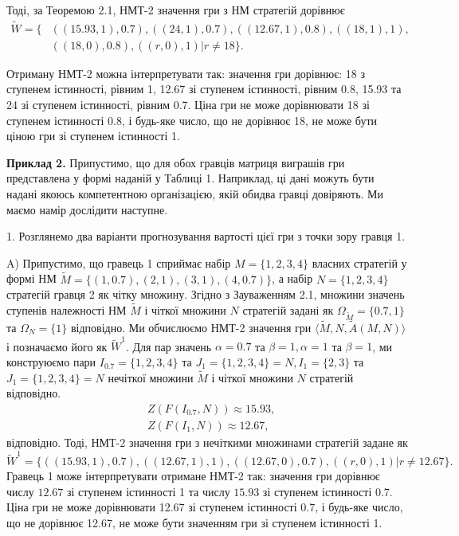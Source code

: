 \documentclass[14pt, a4paper, oneside]{extarticle}
\numberwithin{equation}{section}
\begin{document}
Тоді, за Теоремою 2.1, НМТ-2 значення гри з НМ стратегій дорівнює
\begin{align*}
\tilde{W} = \{ & ((15.93, 1), 0.7), ((24, 1), 0.7), ((12.67, 1), 0.8), ((18, 1), 1),\\
&((18, 0), 0.8), ((r, 0), 1) | r \neq 18\}.
\end{align*}

Отриману НМТ-2 можна інтерпретувати так: значення гри дорівнює: 18 з ступенем істинності, рівним 1, 12.67 зі ступенем істинності, рівним 0.8, 15.93 та 24 зі ступенем істинності, рівним 0.7. Ціна гри не може дорівнювати 18 зі ступенем істинності 0.8, і будь-яке число, що не дорівнює 18, не може бути ціною гри зі ступенем істинності 1.

\textbf{Приклад 2.} Припустимо, що для обох гравців матриця виграшів гри представлена у формі наданій у Таблиці 1. Наприклад, ці дані можуть бути надані якоюсь компетентною організацією, якій обидва гравці довіряють. Ми маємо намір дослідити наступне.

1. Розглянемо два варіанти прогнозування вартості цієї гри з точки зору гравця 1.

A) Припустимо, що гравець 1 сприймає набір $M=\{1,2,3,4\}$ власних стратегій у формі НМ $\tilde{M}=\{(1,0.7), (2,1), (3,1), (4,0.7)\}$, а набір $N=\{1,2,3,4\}$ стратегій гравця 2 як чітку множину. Згідно з Зауваженням 2.1, множини значень ступенів належності НМ $\tilde{M}$ і чіткої множини $N$ стратегій задані як $\Omega_{\tilde{M}}=\{0.7,1\}$ та $\Omega_{N}=\{1\}$ відповідно. Ми обчислюємо НМТ-2 значення гри $\langle\tilde{M}, N, \tilde{A}(M, N)\rangle$ і позначаємо його як $\tilde{W}^{1}$. Для пар значень $\alpha=0.7$ та $\beta=1, \alpha=1$ та $\beta=1$, ми конструюємо пари $I_{0.7}=\{1,2,3,4\}$ та $J_{1}=\{1,2,3,4\}=N, I_{1}=\{2,3\}$ та $J_{1}=\{1,2,3,4\}=N$ нечіткої множини $\tilde{M}$ і чіткої множини $N$ стратегій відповідно.
\begin{align*}
&Z\left(F\left(I_{0.7}, N\right)\right)\approx 15.93,\\
&Z\left(F\left(I_{1},N\right)\right)\approx 12.67,
\end{align*}
відповідно. Тоді, НМТ-2 значення гри з нечіткими множинами стратегій задане як 
\begin{equation*}
\tilde{W}^{1}=\{((15.93, 1), 0.7), ((12.67, 1), 1), ((12.67, 0), 0.7), ((r, 0), 1) | r \neq 12.67\}.
\end{equation*}
Гравець 1 може інтерпретувати отримане НМТ-2 так: значення гри дорівнює числу $12.67$ зі ступенем істинності 1 та числу $15.93$ зі ступенем істинності 0.7. Ціна гри не може дорівнювати 12.67 зі ступенем істинності 0.7, і будь-яке число, що не дорівнює 12.67, не може бути значенням гри зі ступенем істинності 1.
\end{document}
